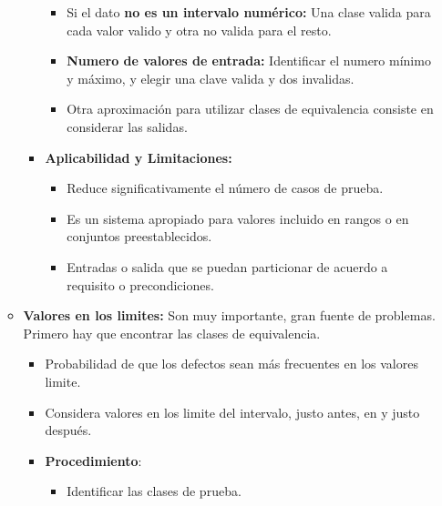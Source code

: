 \documentclass[12pt, twoside, openright]{report} %
\begin{document}
\begin{itemize}
\begin{itemize}
\begin{itemize}
\begin{itemize}
      \item Si el dato \textbf{no es un intervalo numérico:} Una clase
        valida para cada valor valido y otra no valida para el resto.
        
      \item \textbf{Numero de valores de entrada:} Identificar el numero
        mínimo y máximo, y elegir una clave valida y dos invalidas.
        
      \item Otra aproximación para utilizar clases de equivalencia consiste
        en considerar las salidas.
        
      \end{itemize}
    \item \textbf{Aplicabilidad y Limitaciones:}
      

      \begin{itemize}
      \item Reduce significativamente el número de casos de prueba.
        
      \item Es un sistema apropiado para valores incluido en rangos o en
        conjuntos preestablecidos.
        
      \item Entradas o salida que se puedan particionar de acuerdo a
        requisito o precondiciones.
        
      \end{itemize}
    \end{itemize}
  \item \textbf{Valores en los limites:} Son muy importante, gran fuente de
    problemas. Primero hay que encontrar las clases de equivalencia.
    

    \begin{itemize}
    \item Probabilidad de que los defectos sean más frecuentes en los
      valores limite.
      
    \item Considera valores en los limite del intervalo, justo antes, en y
      justo después.
      
    \end{itemize}

    \begin{itemize}
    \item \textbf{Procedimiento}:
      

      \begin{itemize}
      \item Identificar las clases de prueba.
        

\end{itemize}
\end{itemize}
\end{itemize}
\end{itemize}
\end{document}
